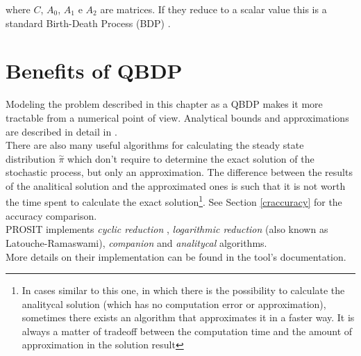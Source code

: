 where \( C \), \( A_{0} \), \( A_{1} \) e \( A_{2} \) are matrices. If they reduce to a scalar value this is a standard Birth-Death Process (BDP) \cite{probGuarantees}.

\section{Benefits of QBDP} \label{benefits}
Modeling the problem described in this chapter as a QBDP makes it more tractable from a numerical point of view. Analytical bounds and approximations are described in detail in \cite{probGuarantees}.\\
There are also many useful algorithms for calculating the steady state distribution \( \overset{\sim}{\pi} \) which don't require to determine the exact solution of the stochastic process, but only an approximation. The difference between the results of the analitical solution and the approximated ones is such that it is not worth the time spent to calculate the exact solution\footnote{In cases similar to this one, in which there is the possibility to calculate the analitycal solution (which has no computation error or approximation), sometimes there exists an algorithm that approximates it in a faster way. It is always a matter of tradeoff between the computation time and the amount of approximation in the solution result}. See Section \ref{craccuracy} for the accuracy comparison.\\
PROSIT implements \emph{cyclic reduction} \cite{cyclic}, \emph{logarithmic reduction} \cite{latouche} (also known as Latouche-Ramaswami), \emph{companion} \cite{probGuarantees} and \emph{analitycal} \cite{probGuarantees} algorithms.\\
More details on their implementation can be found in the tool's documentation.